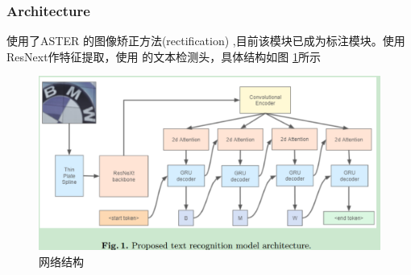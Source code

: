 \documentclass{article}
\begin{document}
\subsubsection{Architecture}
使用了ASTER \cite{shi2018aster}的图像矫正方法(rectification)	,目前该模块已成为标注模块。使用ResNext作特征提取，使用 \cite{krylov2021open}的文本检测头，具体结构如图 \ref{Fig. yet_arch}所示
\begin{figure}
\centering
\includegraphics[scale=0.5]{images/Yet_Another/Architecture.png}
\caption{网络结构}
\label{Fig. yet_arch}
\end{figure}




\end{document}
